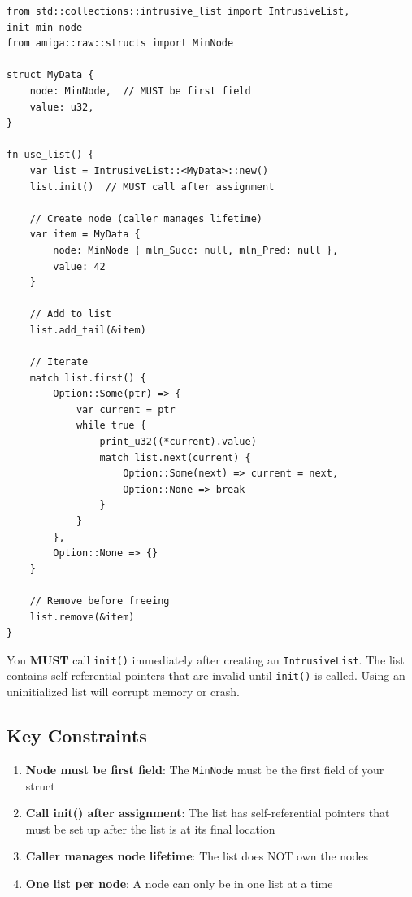 \begin{lstlisting}
from std::collections::intrusive_list import IntrusiveList, init_min_node
from amiga::raw::structs import MinNode

struct MyData {
    node: MinNode,  // MUST be first field
    value: u32,
}

fn use_list() {
    var list = IntrusiveList::<MyData>::new()
    list.init()  // MUST call after assignment

    // Create node (caller manages lifetime)
    var item = MyData {
        node: MinNode { mln_Succ: null, mln_Pred: null },
        value: 42
    }

    // Add to list
    list.add_tail(&item)

    // Iterate
    match list.first() {
        Option::Some(ptr) => {
            var current = ptr
            while true {
                print_u32((*current).value)
                match list.next(current) {
                    Option::Some(next) => current = next,
                    Option::None => break
                }
            }
        },
        Option::None => {}
    }

    // Remove before freeing
    list.remove(&item)
}
\end{lstlisting}

\begin{warningbox}
You \textbf{MUST} call \texttt{init()} immediately after creating an \texttt{IntrusiveList}. The list contains self-referential pointers that are invalid until \texttt{init()} is called. Using an uninitialized list will corrupt memory or crash.
\end{warningbox}

\subsection{Key Constraints}

\begin{enumerate}
    \item \textbf{Node must be first field}: The \texttt{MinNode} must be the first field of your struct
    \item \textbf{Call init() after assignment}: The list has self-referential pointers that must be set up after the list is at its final location
    \item \textbf{Caller manages node lifetime}: The list does NOT own the nodes
    \item \textbf{One list per node}: A node can only be in one list at a time
\end{enumerate}

